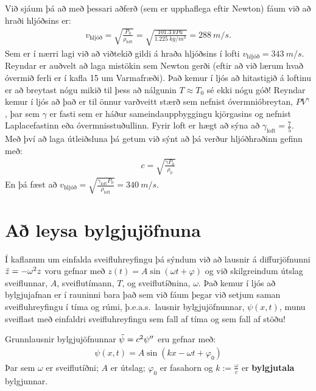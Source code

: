 \ifdefined \wholebook \else\documentclass[oneside]{book}\usepackage{EdlBook}\graphicspath{{figures/}}
\begin{document}
Við sjáum þá að með þessari aðferð (sem er upphaflega eftir Newton) fáum við að hraði hljóðsins er:
\begin{align*}
    v_{\text{hljóð}} = \sqrt{\frac{P_0}{\rho_{\text{loft}}}} = \sqrt{\frac{\SI{101.3}{kPa}}{\SI{1.225}{kg/m^3}}} = \SI{288}{m/s}.
\end{align*}
Sem er í nærri lagi við að viðtekið gildi á hraða hljóðsins í lofti $v_{\text{hljóð}} = \SI{343}{m/s}$. Reyndar er auðvelt að laga mistökin sem Newton gerði (eftir að við lærum hvað óvermið ferli er í kafla 15 um Varmafræði). Það kemur í ljós að hitastigið á loftinu er að breytast nógu mikið til þess að nálgunin $T \approx T_0$ sé ekki nógu góð! Reyndar kemur í ljós að það er til önnur varðveitt stærð sem nefnist óvermnióbreytan, $PV^\gamma$, þar sem $\gamma$ er fasti sem er háður sameindauppbyggingu kjörgasins og nefnist Laplacefastinn eða óvermnisstuðullinn. Fyrir loft er hægt að sýna að $\gamma_{\text{loft}} = \frac{7}{5}$. Með því að laga útleiðsluna þá getum við sýnt að þá verður hljóðhraðinn gefinn með:
\begin{align*}
    c = \sqrt{\frac{\gamma P_0}{\rho_0}}
\end{align*}
En þá fæst að $v_{\text{hljóð}} = \sqrt{\frac{\gamma_{\text{loft}}P_0}{\rho_{\text{loft}}}} = \SI{340}{m/s}$.

\newpage

\section{Að leysa bylgjujöfnuna}

Í kaflanum um einfalda sveifluhreyfingu þá sýndum við að lausnir á diffurjöfnunni $\Ddot{z} = -\omega^2 z$ voru gefnar með $z(t) = A\sin(\omega t + \varphi)$ og við skilgreindum útslag sveiflunnar, $A$, sveiflutímann, $T$, og sveiflutíðnina, $\omega$. Það kemur í ljós að bylgjujafnan er í rauninni bara það sem við fáum þegar við setjum saman sveifluhreyfingu í tíma og rúmi, þ.e.a.s.~lausnir bylgjujöfnunnar, $\psi(x,t)$, munu sveiflast með einfaldri sveifluhreyfingu sem fall af tíma og sem fall af stöðu!

\begin{tcolorbox}
\begin{theorem}
Grunnlausnir bylgjujöfnunnar $\Ddot{\psi} = c^2 \psi''$ eru gefnar með:
\begin{align*}
    \psi(x,t) = A\sin(kx - \omega t + \varphi_0)
\end{align*}
Þar sem $\omega$ er sveiflutíðni; $A$ er útslag; $\varphi_0$ er fasahorn og $k := \frac{\omega}{c}$ er \textbf{bylgjutala} bylgjunnar.
\end{theorem}
\end{tcolorbox}
\end{document}
